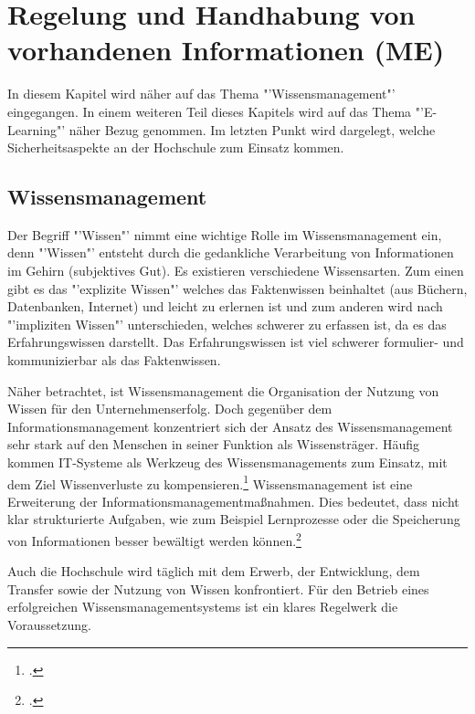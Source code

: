 \section{Regelung und Handhabung von vorhandenen Informationen (ME)}

In diesem Kapitel wird näher auf das Thema "'Wissensmanagement"' eingegangen. In einem weiteren Teil dieses Kapitels wird auf das Thema "'E-Learning"' näher Bezug genommen. Im letzten Punkt wird dargelegt, welche Sicherheitsaspekte an der Hochschule zum Einsatz kommen.

\subsection{Wissensmanagement}

Der Begriff "'Wissen"' nimmt eine wichtige Rolle im Wissensmanagement ein, denn "'Wissen"' entsteht durch die 
gedankliche Verarbeitung von Informationen im Gehirn (subjektives Gut). Es existieren verschiedene Wissensarten. 
Zum einen gibt es das "'explizite Wissen"' welches das Faktenwissen beinhaltet (aus Büchern, Datenbanken, Internet) 
und leicht zu erlernen ist und zum anderen wird nach "'impliziten Wissen"' unterschieden, welches schwerer zu 
erfassen ist, da es das Erfahrungswissen darstellt. Das Erfahrungswissen ist viel schwerer formulier- und 
kommunizierbar als das Faktenwissen. 

Näher betrachtet, ist Wissensmanagement die Organisation der Nutzung von Wissen für den Unternehmenserfolg. 
Doch gegenüber dem Informationsmanagement konzentriert sich der Ansatz des Wissensmanagement sehr stark auf 
den Menschen in seiner Funktion als Wissensträger. Häufig kommen IT-Systeme als Werkzeug des 
Wissensmanagements zum Einsatz, mit dem Ziel Wissenverluste zu kompensieren.\footcite[Vgl.][]{wissensmangement_infowiss.net_2009} Wissensmanagement ist eine 
Erweiterung der Informationsmanagementmaßnahmen. Dies bedeutet, dass nicht klar strukturierte Aufgaben, wie zum 
Beispiel Lernprozesse oder die Speicherung von Informationen besser bewältigt werden können.\footcite[Vgl.][]{wissensmangement_vfhinf.oncampus.de_2013}

Auch die Hochschule wird täglich mit dem Erwerb, der Entwicklung, dem Transfer sowie der Nutzung von Wissen konfrontiert. Für den Betrieb eines erfolgreichen Wissensmanagementsystems ist ein klares Regelwerk die Voraussetzung. 

